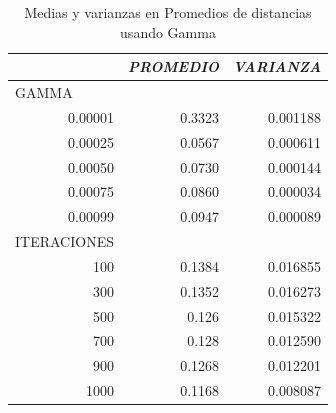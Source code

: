 \begin{table}[H]
\centering
\caption{Medias y varianzas en Promedios de distancias usando Gamma}
\begin{tabular}{rrr}
\multicolumn{1}{l}{}            & \multicolumn{1}{c}{\textit{\textbf{PROMEDIO}}} & \multicolumn{1}{c}{\textit{\textbf{VARIANZA}}} \\ \hline
\multicolumn{1}{l}{GAMMA}     & \multicolumn{1}{l}{}                           & \multicolumn{1}{l}{}                           \\
0.00001                         & 0.3323                                         & 0.001188                                       \\
0.00025                         & 0.0567                                         & 0.000611                                       \\
0.00050                         & 0.0730                                         & 0.000144                                       \\
0.00075                         & 0.0860                                         & 0.000034                                       \\
0.00099                         & 0.0947                                         & 0.000089                                       \\
\multicolumn{1}{l}{ITERACIONES}  & \multicolumn{1}{l}{}                           & \multicolumn{1}{l}{}                           \\
100                             & 0.1384                                         & 0.016855                                       \\
300                             & 0.1352                                         & 0.016273                                       \\
500                             & 0.126                                          & 0.015322                                       \\
700                             & 0.128                                          & 0.012590                                       \\
900                             & 0.1268                                         & 0.012201                                       \\
1000                            & 0.1168                                         & 0.008087 \\ \hline                                   
\end{tabular}
\label{media_var_1}
\end{table}

